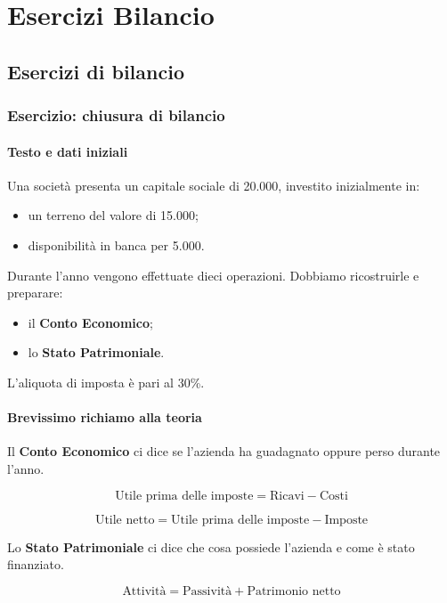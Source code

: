 \chapter{Esercizi Bilancio}
\section{Esercizi di bilancio}
\subsection{Esercizio: chiusura di bilancio}
\subsubsection*{Testo e dati iniziali}

\noindent Una società presenta un capitale sociale di
20.000, investito inizialmente in:

\begin{itemize}
    \item un terreno del valore di 15.000;
    \item disponibilità in banca per 5.000.
\end{itemize}

\noindent Durante l'anno vengono effettuate dieci
operazioni. Dobbiamo ricostruirle e preparare:

\begin{itemize}
    \item il \textbf{Conto Economico};
    \item lo \textbf{Stato Patrimoniale}.
\end{itemize}

\noindent L'aliquota di imposta è pari al 30\%.

\subsubsection*{Brevissimo richiamo alla teoria}

\noindent Il \textbf{Conto Economico} ci dice
se l'azienda ha guadagnato oppure perso durante l'anno.

\[
\boxed{
\text{Utile prima delle imposte}
=
\text{Ricavi}-\text{Costi}
}
\]

\[
\boxed{
\text{Utile netto}
=
\text{Utile prima delle imposte}-\text{Imposte}
}
\]

\noindent Lo \textbf{Stato Patrimoniale} ci dice
che cosa possiede l'azienda e come è stato finanziato.

\[
\boxed{
\text{Attività}
=
\text{Passività}+\text{Patrimonio netto}
}
\]

